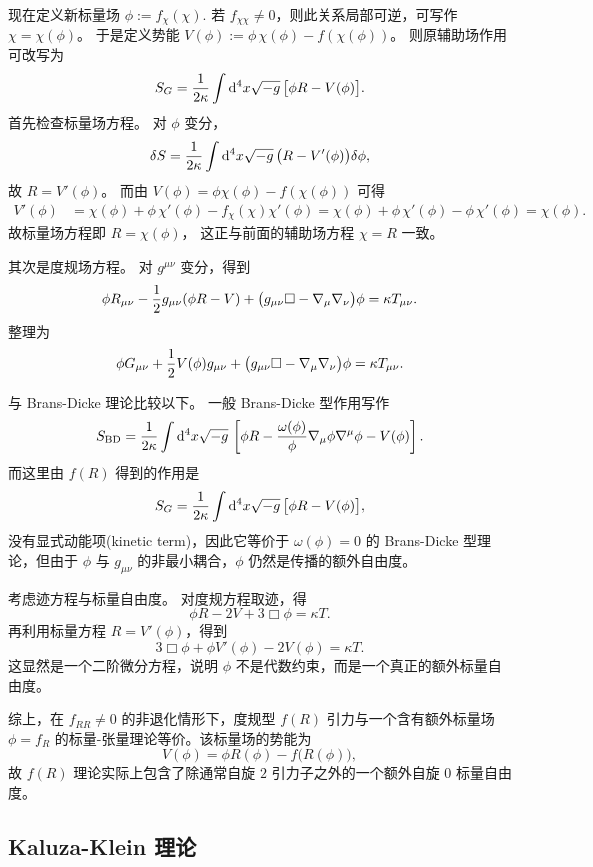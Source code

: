 现在定义新标量场 $\phi:=f_\chi(\chi).$
若 $f_{\chi\chi}\neq 0$，则此关系局部可逆，可写作 $\chi=\chi(\phi)$。
于是定义势能 $V(\phi):=\phi\,\chi(\phi)-f(\chi(\phi))$。
则原辅助场作用可改写为
\[
S_G
=
\frac1{2\kappa}\int \dd[4]x\sqrt{-g}\,\bigl[\phi R-V(\phi)\bigr]
.
\]
首先检查标量场方程。
对 $\phi$ 变分，
\[
\delta S
=
\frac1{2\kappa}\int \dd[4]x\sqrt{-g}\,
\bigl(R-V'(\phi)\bigr)\delta\phi,
\]
故
$
R=V'(\phi)
$。
而由
$
V(\phi)=\phi\chi(\phi)-f(\chi(\phi))
$
可得
\begin{align*}
V'(\phi)
&=
\chi(\phi)+\phi\,\chi'(\phi)-f_\chi(\chi)\chi'(\phi) =
\chi(\phi)+\phi\,\chi'(\phi)-\phi\,\chi'(\phi) =
\chi(\phi).
\end{align*}
故标量场方程即
$
R=\chi(\phi)
$，
这正与前面的辅助场方程 $\chi=R$ 一致。

其次是度规场方程。
对 $g^{\mu\nu}$ 变分，得到
\[
\phi R_{\mu\nu}
-\frac12 g_{\mu\nu}(\phi R-V)
+\bigl(g_{\mu\nu}\Box-\nabla_\mu\nabla_\nu\bigr)\phi
=
\kappa T_{\mu\nu}.
\]
整理为
\[
\phi G_{\mu\nu}
+\frac12 V(\phi)g_{\mu\nu}
+\bigl(g_{\mu\nu}\Box-\nabla_\mu\nabla_\nu\bigr)\phi
=
\kappa T_{\mu\nu}.
\]

与 Brans-Dicke 理论比较以下。
一般 Brans-Dicke 型作用写作
\[
S_{\mathrm{BD}}
=
\frac1{2\kappa}\int \dd[4]x\sqrt{-g}\,
\left[
\phi R-\frac{\omega(\phi)}{\phi}\nabla_\mu\phi\nabla^\mu\phi-V(\phi)
\right].
\]
而这里由 $f(R)$ 得到的作用是
\[
S_G
=
\frac1{2\kappa}\int \dd[4]x\sqrt{-g}\,\bigl[\phi R-V(\phi)\bigr],
\]
没有显式动能项(kinetic term)，因此它等价于
$
\omega(\phi)=0
$
的 Brans-Dicke 型理论，但由于 $\phi$ 与 $g_{\mu\nu}$ 的非最小耦合，$\phi$ 仍然是传播的额外自由度。

考虑迹方程与标量自由度。
对度规方程取迹，得
\[
\phi R-2V+3\Box\phi=\kappa T.
\]
再利用标量方程 $R=V'(\phi)$，得到
\[
3\Box\phi+\phi V'(\phi)-2V(\phi)=\kappa T.
\]
这显然是一个二阶微分方程，说明 $\phi$ 不是代数约束，而是一个真正的额外标量自由度。

综上，在 $f_{RR}\neq 0$ 的非退化情形下，度规型 $f(R)$ 引力与一个含有额外标量场 $\phi=f_R$ 的标量-张量理论等价。该标量场的势能为
\[
V(\phi)=\phi R(\phi)-f\bigl(R(\phi)\bigr),
\]
故 $f(R)$ 理论实际上包含了除通常自旋 $2$ 引力子之外的一个额外自旋 $0$ 标量自由度。

\subsection{Kaluza-Klein 理论}

